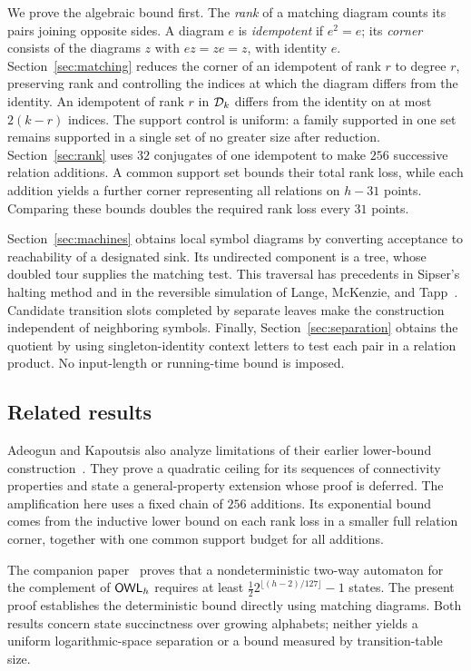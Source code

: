 We prove the algebraic bound first. The \emph{rank} of a matching diagram
counts its pairs joining opposite sides. A diagram $e$ is
\emph{idempotent} if $e^2=e$; its \emph{corner} consists of the diagrams
$z$ with $ez=ze=z$, with identity $e$. Section~\ref{sec:matching} reduces
the corner of an idempotent of rank $r$ to degree $r$, preserving rank
and controlling the indices at which the diagram differs from the
identity. An idempotent of rank $r$ in $\mathcal D_{k}$ differs
from the identity on at most $2(k-r)$ indices. The support control is
uniform: a family supported in one set remains supported in a single
set of no greater size after reduction. Section~\ref{sec:rank} uses
$32$ conjugates of one idempotent to make $256$ successive relation
additions. A common support set bounds their total rank loss, while
each addition yields a further corner representing all relations on
$h-31$ points. Comparing these bounds doubles the required rank loss
every $31$ points.

Section~\ref{sec:machines} obtains local symbol diagrams by converting
acceptance to reachability of a designated sink. Its undirected component
is a tree, whose doubled tour supplies the matching test. This traversal
has precedents in Sipser's halting method and in the reversible
simulation of Lange, McKenzie, and
Tapp~\cite{SipserHalting1980,LangeMcKenzieTapp2000}. Candidate
transition slots completed by separate leaves make the construction
independent of neighboring symbols. Finally,
Section~\ref{sec:separation} obtains the quotient by using
singleton-identity context letters to test each pair in a relation
product. No input-length or running-time bound is imposed.

\subsection{Related results}

Adeogun and Kapoutsis also analyze limitations of their earlier
lower-bound construction~\cite{AdeogunKapoutsisLimitation2026}. They
prove a quadratic ceiling for its sequences of connectivity properties
and state a general-property extension whose proof is deferred.
The amplification here uses a fixed chain of $256$ additions. Its
exponential bound comes from the inductive lower bound on each rank
loss in a smaller full relation corner, together with one common
support budget for all additions.

The companion paper~\cite[Theorem~1.1]{CompanionComplementation2026}
proves that a nondeterministic two-way automaton for the complement of
$\mathsf{OWL}_h$ requires at least
$\frac12 2^{\lfloor(h-2)/127\rfloor}-1$ states. The present proof
establishes the deterministic bound directly using matching diagrams.
Both results concern state succinctness over
growing alphabets; neither yields a uniform logarithmic-space
separation or a bound measured by transition-table size.
